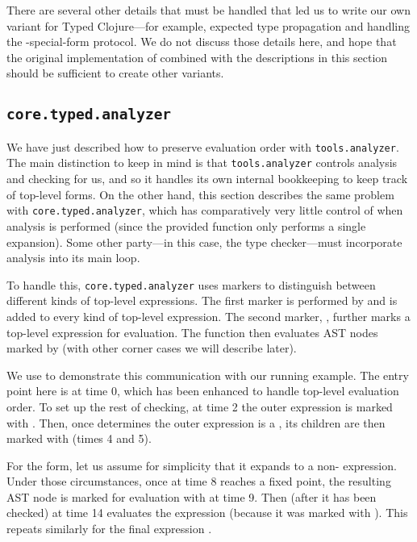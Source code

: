 There are several other details that must be handled
that led us to write our own  variant for Typed Clojure---for
example, expected type propagation and
handling the -special-form protocol. We
do not discuss those details here, and hope that
the original implementation of  combined with the
descriptions in this section should be sufficient to create other variants.

\subsection{\texttt{core.typed.analyzer}}

We have just described how to preserve evaluation order with \texttt{tools.analyzer}.
The main distinction to keep in mind is that \texttt{tools.analyzer} controls
analysis and checking for us, and so it handles its own internal bookkeeping 
to keep track of top-level forms.
On the other hand, this section describes the same problem with \texttt{core.typed.analyzer},
which has comparatively very little control of when analysis is performed
(since the provided  function only performs a single expansion).
Some other party---in this case, the type checker---must incorporate analysis into its
main loop.

To handle this, \texttt{core.typed.analyzer} uses markers to
distinguish between
different kinds of top-level expressions.
The first marker is performed by
and is added to every kind of top-level expression.
The second marker, ,
further marks a top-level expression for evaluation.
The  function 
then evaluates AST nodes marked by 
(with other corner cases we will describe later).

We use 
to demonstrate this communication with our running example.
The entry point here is  at time 0, which has been enhanced
to handle top-level evaluation order.
To set up the rest of checking,
at time 2 the outer  expression is marked with .
Then, once  determines the outer expression is a ,
its children are then marked with  (times 4 and 5).

For the  form, let us assume for simplicity that
it expands to a non- expression.
Under those circumstances, 
once  at time 8 reaches a fixed point, the resulting AST node is marked
for evaluation with  at time 9.
Then (after it has been checked) at time 14  evaluates the 
expression (because it was marked with ).
This repeats similarly for the final expression .

